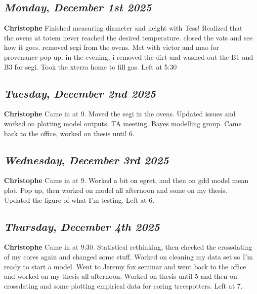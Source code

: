 \begin{center}
\section*{\month}
\end{center}

\def\day{\textit{December 1st 2025}}
\def\weekday{\textit{Monday}}
\subsection*{\weekday, \day}
\textbf {Christophe}
Finished measuring diameter and height with Tess! Realized that the ovens at totem never reached the desired temperature. closed the vats and see how it goes. removed segi from the ovens. Met with victor and mao for provenance pop up. in the evening, i removed the dirt and washed out the B1 and B3 for segi. Took the xterra home to fill gas. Left at 5:30

\def\day{\textit{December 2nd 2025}}
\def\weekday{\textit{Tuesday}}
\subsection*{\weekday, \day}
\textbf {Christophe}
Came in at 9. Moved the segi in the ovens. Updated issues and worked on plotting model outputs. TA meeting. Bayes modelling group. Came back to the office, worked on thesis until 6.

\def\day{\textit{December 3rd 2025}}
\def\weekday{\textit{Wednesday}}
\subsection*{\weekday, \day}
\textbf {Christophe}
Came in at 9. Worked a bit on egret, and then on gdd model mean plot. Pop up, then worked on model all afternoon and some on my thesis. Updated the figure of what I'm testing. Left at 6.

\def\day{\textit{December 4th 2025}}
\def\weekday{\textit{Thursday}}
\subsection*{\weekday, \day}
\textbf {Christophe}
Came in at 9:30. Statistical rethinking, then checked the crossdating of my cores again and changed some stuff. Worked on cleaning my data set so I'm ready to start a model. Went to Jeremy fox seminar and went back to the office and worked on my thesis all afternoon. Worked on thesis until 5 and then on crossdating and some plotting empirical data for coring treespotters. Left at 7.

